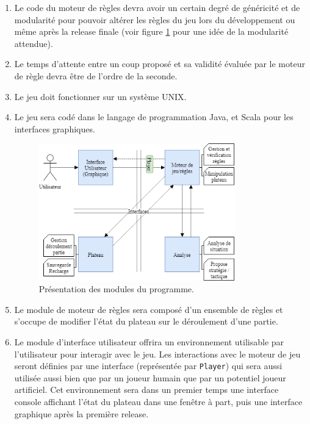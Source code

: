 \documentclass[a4paper]{report}
\begin{document}
\begin{enumerate}
\item Le code du moteur de règles devra avoir un certain degré de généricité et de modularité pour pouvoir altérer les règles du jeu lors du développement ou même après la release finale (voir figure \ref{fig:modules} pour une idée de la modularité attendue).

\item Le temps d'attente entre un coup proposé et sa validité évaluée par le moteur de règle devra être de l'ordre de la seconde.


\item Le jeu doit fonctionner sur un système UNIX.

\item Le jeu sera codé dans le langage de programmation Java, et Scala pour les interfaces graphiques.


\begin{figure}[h]
\label{fig:modules}
\caption{Présentation des modules du programme.}
\centering
\includegraphics[width=0.8\textwidth]{pdp_modules}
\end{figure}

\item Le module de moteur de règles sera composé d'un ensemble de règles et s'occupe de modifier l'état du plateau sur le déroulement d'une partie.

\item Le module d'interface utilisateur offrira un environnement utilisable par l'utilisateur pour interagir avec le jeu. Les interactions avec le moteur de jeu seront définies par une interface (représentée par \texttt{Player}) qui sera aussi utilisée aussi bien que par un joueur humain que par un potentiel joueur artificiel. Cet environnement sera dans un premier temps une interface console affichant l'état du plateau dans une fenêtre à part, puis une interface graphique après la première release. %


\end{enumerate}
\end{document}
